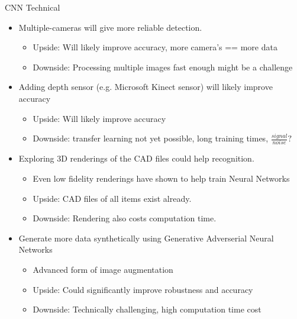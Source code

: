 \documentclass{beamer}
\begin{document}
\begin{frame}{CNN Technical}
\begin{itemize}
 \item Multiple-cameras will give more reliable detection.
  \begin{itemize}
  \item Upside: Will likely improve accuracy, more camera's == more data
  \item Downside: Processing multiple images fast enough might be a challenge 
  \end{itemize}
 \item Adding depth sensor (e.g. Microsoft Kinect sensor) will likely improve accuracy 
  \begin{itemize}
  \item Upside: Will likely improve accuracy 
  \item Downside: transfer learning not yet possible, long training times, $\frac{signal}{noise}?$
  \end{itemize}
 \item Exploring 3D renderings of the CAD files could help recognition.
    \begin{itemize}
      \item Even low fidelity renderings have shown to help train Neural Networks
      \item Upside: CAD files of all items exist already.
      \item Downside: Rendering also costs computation time. 
    \end{itemize}
 \item Generate more data synthetically using Generative Adverserial Neural Networks
    \begin{itemize}
      \item Advanced form  of image augmentation 
      \item Upside: Could significantly improve robustness and accuracy 
      \item Downside: Technically challenging, high computation time cost 
    \end{itemize}
\end{itemize}
\end{frame}
\end{document}
